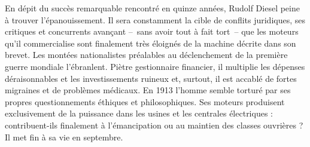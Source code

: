 	En dépit du succès remarquable rencontré en quinze années, Rudolf Diesel peine à trouver l’épanouissement. Il sera constamment la cible de conflits juridiques, ses critiques et concurrents avançant --\ sans avoir tout à fait tort\ -- que les moteurs qu’il commercialise sont finalement très éloignés de la machine décrite dans son brevet. Les montées nationalistes préalables au déclenchement de la première guerre mondiale l’ébranlent. Piètre gestionnaire financier, il multiplie les dépenses déraisonnables et les investissements ruineux et, surtout, il est accablé de fortes migraines et de problèmes médicaux. En 1913 l’homme semble torturé par ses propres questionnements éthiques et philosophiques. Ses moteurs produisent exclusivement de la puissance dans les usines et les centrales électriques : contribuent-ils finalement à l’émancipation ou au maintien des classes ouvrières ? Il met fin à sa vie en septembre.
	
